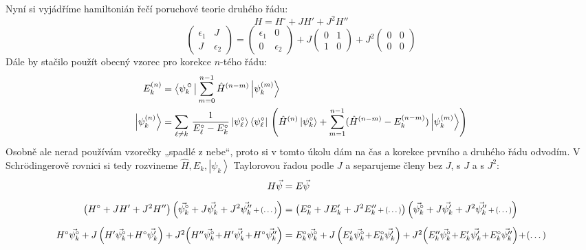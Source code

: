 \documentclass[10pt,a4paper]{article}
\newcommand*{\mask}[2]{%
    \mathord{\makebox[\widthof{\(#1\)}]{\(#2\)}}%
}
\newcommand{\mat}[1]{
    \begin{pmatrix}
        #1
    \end{pmatrix}
}
\newcommand{\bra}[1]{\left< #1 \right|}
\newcommand{\ket}[1]{\left| #1 \right>}
\begin{document}
Nyní si vyjádříme hamiltonián řečí poruchové teorie druhého řádu:
\begin{equation*}
    H = H^{\circ} + J H' + J^2 H''
\end{equation*}
\begin{equation*}
    \mat{ \epsilon_1 & J \\ J & \epsilon_2 }
    = \mat{ \epsilon_1 & 0 \\ 0 & \epsilon_2 }
    + J \mat{ 0 & 1 \\ 1 & 0 }
    + J^2 \mat{ 0 & 0 \\ 0 & 0 }
\end{equation*}
Dále by stačilo použít obecný vzorec pro korekce $n$-tého řádu:
\begin{align*}
    E^{(n)}_k &=
    \bra{\psi^{\mask{()}{\circ}}_k}
    \sum_{m=0}^{n-1} \hat{H}^{(n-m)} \ket{\psi^{(m)}_k}
    \\
    \ket{\psi^{(n)}_k} &=
    \sum_{\ell \neq k} \, \frac{1}{E^{\circ}_\ell - E^{\circ}_k}
    \ket{\psi^{\circ}_\ell} \bra{\psi^{\circ}_\ell} \,
    \left(
        \hat{H}^{(n)} \ket{\psi^{\circ}_k} +
        \sum_{m=1}^{n-1} (\hat{H}^{(n-m)} - E^{(n-m)}_k) \ket{\psi^{(m)}_k}
    \right)
\end{align*}
Osobně ale nerad používám vzorečky „spadlé z nebe“, proto si v tomto úkolu dám na čas a korekce prvního a druhého řádu odvodím. V Schrödingerově rovnici si tedy rozvineme $\hat{H}, E_k, \ket{\psi_k}$ Taylorovou řadou podle $J$ a separujeme členy bez $J$, s $J$ a s $J^2$:
\begin{align*}
    H \vec{\psi} &= E \vec{\psi}
    \\[5pt]
    \left(H^{\circ} + J H' + J^2 H''\right)
    \left(\vec{\psi_k^{\circ}} + J \vec{\psi_k'} + J^2 \vec{\psi_k''} \scalebox{0.8}{$\,+\, (\dots)$} \right)
    &=
    \left(E^{\circ}_k + J E_k' + J^2 E_k'' \scalebox{0.8}{$\,+\, (\dots)$}\right)
    \left(\vec{\psi_k^{\circ}} + J \vec{\psi_k'} + J^2 \vec{\psi_k''} \scalebox{0.8}{$\,+\, (\dots)$} \right)
    \\[5pt]
    \scalebox{0.97}{$H^{\circ} \vec{\psi_k^{\circ}} +
    J\left( H' \vec{\psi_k^{\circ}} \!+\! H^{\circ} \vec{\psi_k'} \right) +
    J^2\!\left(H'' \vec{\psi_k^{\circ}} \!+\! H' \vec{\psi_k'} \!+\! H^{\circ} \vec{\psi_k''} \right)$}
    &=
    \scalebox{0.97}{$E^{\circ}_k \vec{\psi_k^{\circ}} +
    J\left( E_k' \vec{\psi_k^{\circ}} \!+\! E^{\circ}_k \vec{\psi_k'} \right) +
    J^2\!\left(E_k'' \vec{\psi_k^{\circ}} \!+\! E_k' \vec{\psi_k'} \!+\! E^{\circ}_k \vec{\psi_k''} \right) \!+\! (\dots)$}
\end{align*}
\end{document}
